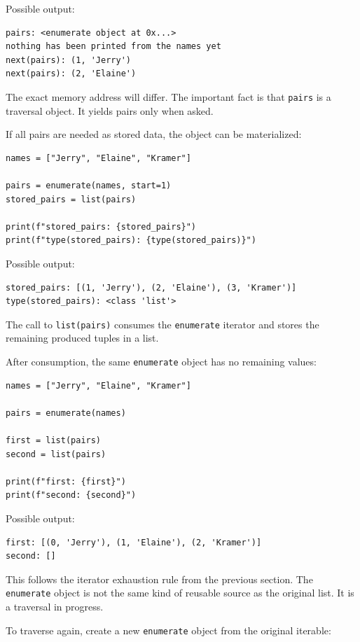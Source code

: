 Possible output:

\begin{verbatim}
pairs: <enumerate object at 0x...>
nothing has been printed from the names yet
next(pairs): (1, 'Jerry')
next(pairs): (2, 'Elaine')
\end{verbatim}

The exact memory address will differ. The important fact is that \texttt{pairs} is a traversal object. It yields pairs only when asked.

If all pairs are needed as stored data, the object can be materialized:

\begin{verbatim}
names = ["Jerry", "Elaine", "Kramer"]

pairs = enumerate(names, start=1)
stored_pairs = list(pairs)

print(f"stored_pairs: {stored_pairs}")
print(f"type(stored_pairs): {type(stored_pairs)}")
\end{verbatim}

Possible output:

\begin{verbatim}
stored_pairs: [(1, 'Jerry'), (2, 'Elaine'), (3, 'Kramer')]
type(stored_pairs): <class 'list'>
\end{verbatim}

The call to \texttt{list(pairs)} consumes the \texttt{enumerate} iterator and stores the remaining produced tuples in a list.

After consumption, the same \texttt{enumerate} object has no remaining values:

\begin{verbatim}
names = ["Jerry", "Elaine", "Kramer"]

pairs = enumerate(names)

first = list(pairs)
second = list(pairs)

print(f"first: {first}")
print(f"second: {second}")
\end{verbatim}

Possible output:

\begin{verbatim}
first: [(0, 'Jerry'), (1, 'Elaine'), (2, 'Kramer')]
second: []
\end{verbatim}

This follows the iterator exhaustion rule from the previous section. The \texttt{enumerate} object is not the same kind of reusable source as the original list. It is a traversal in progress.

To traverse again, create a new \texttt{enumerate} object from the original iterable:

